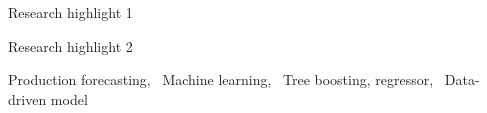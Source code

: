\documentclass[preprint,12pt,authoryear]{elsarticle}
\begin{document}
\begin{frontmatter}
\begin{abstract}


\end{abstract}

\begin{graphicalabstract}
\end{graphicalabstract}

\begin{highlights}
\item Research highlight 1
\item Research highlight 2
\end{highlights}

\begin{keyword}
Production forecasting, \ Machine learning, \ Tree boosting, regressor, \ Data-driven model


\end{keyword}

\end{frontmatter}







% 
% 
% 

\end{document}
